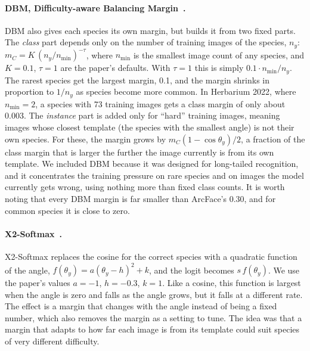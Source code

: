 \documentclass[11pt]{article}
\begin{document}
\paragraph{DBM, Difficulty-aware Balancing Margin~\citep{dbm}.} DBM also gives each
species its own margin, but builds it from two fixed parts. The \emph{class} part depends
only on the number of training images of the species, $n_y$:
$m_C = K\,(n_y/n_{\min})^{-\tau}$, where $n_{\min}$ is the smallest image count of any
species, and $K = 0.1$, $\tau = 1$ are the paper's defaults. With $\tau = 1$ this is
simply $0.1 \cdot n_{\min}/n_y$. The rarest species get the largest margin, 0.1, and the
margin shrinks in proportion to $1/n_y$ as species become more common. In Herbarium 2022,
where $n_{\min} = 2$, a species with 73 training images gets a class margin of only about
0.003. The \emph{instance} part is added only for ``hard'' training images, meaning images
whose closest template (the species with the smallest angle) is not their own species.
For these, the margin grows by $m_C (1 - \cos\theta_y)/2$, a fraction of the class margin
that is larger the further the image currently is from its own template. We included
DBM because it was designed for long-tailed recognition, and it concentrates the
training pressure on rare species and on images the model currently gets wrong, using
nothing more than fixed class counts. It is worth noting that every DBM margin is far
smaller than ArcFace's 0.30, and for common species it is close to zero.

\paragraph{X2-Softmax~\citep{x2softmax}.} X2-Softmax replaces the cosine for the correct
species with a quadratic function of the angle, $f(\theta_y) = a(\theta_y - h)^2 + k$,
and the logit becomes $s\,f(\theta_y)$. We use the paper's values $a = -1$, $h = -0.3$,
$k = 1$. Like a cosine, this function is largest when the angle is zero and falls as the
angle grows, but it falls at a different rate. The effect is a margin that changes
with the angle instead of being a fixed number, which also removes the margin as a
setting to tune. The idea was that a margin that adapts to how far each image is from
its template could suit species of very different difficulty.
\end{document}

